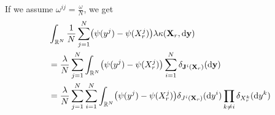 \documentclass{article}
\begin{document}
If we assume $\omega^{ij} = \frac{\omega}{N}$, we get
\begin{equation}\label{eq:kappa-to-mean-kappa}
\begin{split}
    &\int_{\potspace^N} \frac{1}{N} \sum_{j=1}^N \br*{ \psi(y^j) - \psi(X_{r}^j) } \lambda \kappa(\bm{X}_r, \odif{\bm{y}}) \\
    &= \frac{\lambda}{N} \sum_{j=1}^N \int_{\potspace^N} \br*{ \psi(y^j) - \psi(X_{r}^j) } \sum_{i=1}^N \delta_{\bm{\jtarg}^i(\bm{X}_r)}(\odif{\bm{y}}) \\
    &= \frac{\lambda}{N} \sum_{j=1}^N \sum_{i=1}^N \int_{\potspace^N} \br*{ \psi(y^j) - \psi(X_{r}^j) } \delta_{\jtarg^i(\bm{X}_r)}(\odif{y^i}) \prod_{k \neq i} \delta_{X_r^k}(\odif{y^k}) \\

\end{split}
\end{equation}
\end{document}

